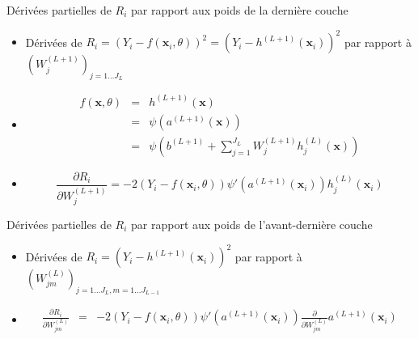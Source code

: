 \documentclass[ignorenonframetext,]{beamer}
\providecommand{\tightlist}{%
  \setlength{\itemsep}{0pt}\setlength{\parskip}{0pt}}
\begin{document}
\begin{frame}{Dérivées partielles de \(R_i\) par rapport aux poids de la
dernière couche}

\begin{itemize}
\tightlist
\item
  Dérivées de
  \(R_i = \left(Y_{i} - f(\mathbf{x}_i,\theta)\right)^2= \left(Y_i - h^{(L+1)}(\mathbf{x}_i)\right)^2\)
  par rapport à \((W_j^{(L+1)})_{j=1\dots J_{L}}\)
\end{itemize}

\begin{itemize}
\item
  \begin{eqnarray*}
  f(\mathbf{x} ,\theta) &=& h^{(L+1)}(\mathbf{x}) \\
  &=& \psi(a^{(L+1)}(\mathbf{x}))  \\
  & =& \psi\left(b^{(L+1)} +\sum_{j=1}^{J_L} W_j^{(L+1)} h_j^{(L)}(\mathbf{x}) \right)
  \end{eqnarray*}
\item
  \[ \frac{\partial R_i }{\partial W^{(L+1)}_{j}} = -2\left(Y_{i} - f(\mathbf{x}_i,\theta)\right)\psi'\left(a^{(L+1)}(\mathbf{x}_i)\right)h_j^{(L)}(\mathbf{x}_i)\]
\end{itemize}

\end{frame}

\begin{frame}{Dérivées partielles de \(R_i\) par rapport aux poids de
l'avant-dernière couche}

\begin{itemize}
\item
  Dérivées de \(R_i = \left(Y_i - h^{(L+1)}(\mathbf{x}_i)\right)^2\) par
  rapport à \((W_{jm}^{(L)})_{j=1\dots J_{L},m=1\dots J_{L-1}}\)
\item
  \begin{eqnarray*}
  \frac{\partial R_i }{\partial W^{(L)}_{jm}} &=& -2\left(Y_{i} - f(\mathbf{x}_i,\theta)\right)\psi'\left(a^{(L+1)}(\mathbf{x}_i)\right) \frac{\partial}{\partial W^{(L)}_{jm}}  a^{(L+1)}(\mathbf{x}_i)
  \end{eqnarray*}
\end{itemize}

\end{frame}
\end{document}
